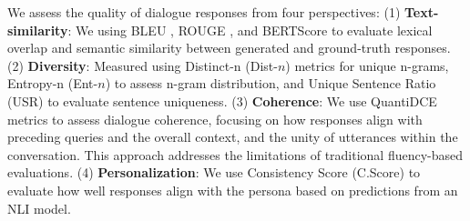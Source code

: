 \documentclass[letterpaper]{article} %
\begin{document}
We assess the quality of dialogue responses from four perspectives: (1) \textbf{Text-similarity}: We using BLEU \cite{papineni-etal-2002-bleu}, ROUGE \cite{lin-2004-rouge}, and BERTScore \cite{zhang-etal-2020-bert-score} to evaluate lexical overlap and semantic similarity between generated and ground-truth responses. (2) \textbf{Diversity}: Measured using Distinct-n (Dist-$n$) \cite{li-etal-2016-diversity} metrics for unique n-grams, Entropy-n (Ent-$n$) \cite{zhang-etal-2018-generating} to assess n-gram distribution, and Unique Sentence Ratio (USR) \cite{li-etal-2020-generate} to evaluate sentence uniqueness. (3) \textbf{Coherence}: We use QuantiDCE metrics \cite{ye-etal-2021-towards-quantifiable} to assess dialogue coherence, focusing on how responses align with preceding queries and the overall context, and the unity of utterances within the conversation. This approach addresses the limitations of traditional fluency-based evaluations. (4) \textbf{Personalization}: We use Consistency Score (C.Score) \cite{madotto-etal-2019-personalizing} to evaluate how well responses align with the persona based on predictions from an NLI model.







\end{document}
